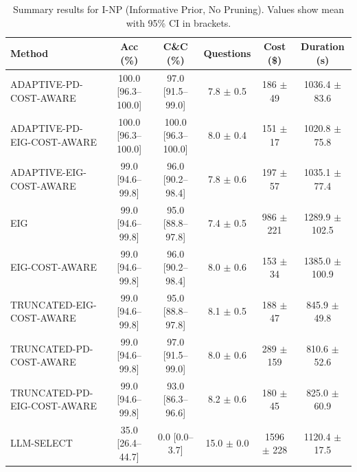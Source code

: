 \begin{table}[htbp]
\centering
\small
\caption{Summary results for I-NP (Informative Prior, No Pruning). Values show mean with 95\% CI in brackets.}
\label{tab:results-notprune_notuniform}
\begin{tabular}{@{}lccccc@{}}
\toprule
Method & Acc (\%) & C\&C (\%) & Questions & Cost (\$) & Duration (s) \\
\midrule
ADAPTIVE-PD-COST-AWARE & 100.0 [96.3--100.0] & 97.0 [91.5--99.0] & 7.8 $\pm$ 0.5 & 186 $\pm$ 49 & 1036.4 $\pm$ 83.6 \\
ADAPTIVE-PD-EIG-COST-AWARE & 100.0 [96.3--100.0] & 100.0 [96.3--100.0] & 8.0 $\pm$ 0.4 & 151 $\pm$ 17 & 1020.8 $\pm$ 75.8 \\
ADAPTIVE-EIG-COST-AWARE & 99.0 [94.6--99.8] & 96.0 [90.2--98.4] & 7.8 $\pm$ 0.6 & 197 $\pm$ 57 & 1035.1 $\pm$ 77.4 \\
EIG & 99.0 [94.6--99.8] & 95.0 [88.8--97.8] & 7.4 $\pm$ 0.5 & 986 $\pm$ 221 & 1289.9 $\pm$ 102.5 \\
EIG-COST-AWARE & 99.0 [94.6--99.8] & 96.0 [90.2--98.4] & 8.0 $\pm$ 0.6 & 153 $\pm$ 34 & 1385.0 $\pm$ 100.9 \\
TRUNCATED-EIG-COST-AWARE & 99.0 [94.6--99.8] & 95.0 [88.8--97.8] & 8.1 $\pm$ 0.5 & 188 $\pm$ 47 & 845.9 $\pm$ 49.8 \\
TRUNCATED-PD-COST-AWARE & 99.0 [94.6--99.8] & 97.0 [91.5--99.0] & 8.0 $\pm$ 0.6 & 289 $\pm$ 159 & 810.6 $\pm$ 52.6 \\
TRUNCATED-PD-EIG-COST-AWARE & 99.0 [94.6--99.8] & 93.0 [86.3--96.6] & 8.2 $\pm$ 0.6 & 180 $\pm$ 45 & 825.0 $\pm$ 60.9 \\
LLM-SELECT & 35.0 [26.4--44.7] & 0.0 [0.0--3.7] & 15.0 $\pm$ 0.0 & 1596 $\pm$ 228 & 1120.4 $\pm$ 17.5 \\
\bottomrule
\end{tabular}
\end{table}